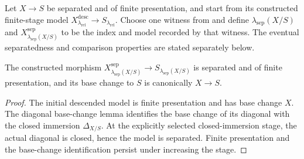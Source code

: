 \begin{definition}
  \label{def:nagata-separated-descent-stage}

  Let $X\to S$ be separated and of finite presentation, and start from its
  constructed finite-stage model
  $X^{\mathrm{desc}}_{\lambda_{\mathrm{rel}}}\to
  S_{\lambda_{\mathrm{rel}}}$.  Choose one witness from
   and define
  $\lambda_{\mathrm{sep}}(X/S)$ and
  $X^{\mathrm{sep}}_{\lambda_{\mathrm{sep}}(X/S)}$ to be the index and model
  recorded by that witness.  The eventual separatedness and comparison
  properties are stated separately below.
\end{definition}

\begin{lemma}
  \label{lemma:nagata-separated-eventually}
  \leanok

  The constructed morphism
  $X^{\mathrm{sep}}_{\lambda_{\mathrm{sep}}(X/S)}
  \to S_{\lambda_{\mathrm{sep}}(X/S)}$ is
  separated and of finite presentation, and its base change to $S$ is
  canonically $X\to S$.
\end{lemma}

\begin{proof}
  \leanok
  The initial descended model is finite presentation and has base change $X$.
  The diagonal base-change lemma identifies the base change of its diagonal
  with the closed immersion $\Delta_{X/S}$.  At the explicitly selected
  closed-immersion stage, the actual diagonal is closed, hence the model is
  separated.  Finite presentation and the base-change identification persist
  under increasing the stage.
\end{proof}


